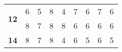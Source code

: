 \begin{table}[!htbp]
{\begin{tabular}{|c|ll|ll|ll|ll|}
\multirow{2}{*}{\textbf{12}}     & \multicolumn{1}{l|}{6}                                                                                  & 5                                                                                                    & \multicolumn{1}{l|}{8}                                                                                  & 4                                                                                                    & \multicolumn{1}{l|}{7}                                                                                  & 6                                                                                                    & \multicolumn{1}{l|}{7}                                                                                  & 6                                                                                                    \\ \cline{2-9} 
                                 & \multicolumn{1}{l|}{8}                                                                                  & 7                                                                                                    & \multicolumn{1}{l|}{8}                                                                                  & 8                                                                                                    & \multicolumn{1}{l|}{6}                                                                                  & 6                                                                                                    & \multicolumn{1}{l|}{6}                                                                                  & 6                                                                                                    \\ \hline
\multirow{2}{*}{\textbf{14}}     & \multicolumn{1}{l|}{8}                                                                                  & 7                                                                                                    & \multicolumn{1}{l|}{8}                                                                                  & 4                                                                                                    & \multicolumn{1}{l|}{6}                                                                                  & 5                                                                                                    & \multicolumn{1}{l|}{6}                                                                                  & 5                                                                                                    \\ \cline{2-9} 

\end{tabular}}
\end{table}
